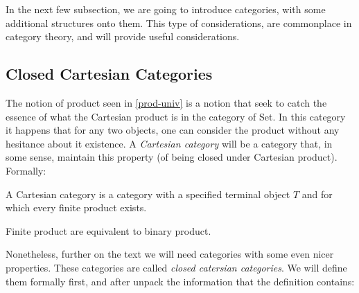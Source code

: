   In the next few subsection, we are going to introduce categories, with some additional structures onto them. This type of considerations, are commonplace in category theory, and will provide useful considerations.

  


  \subsection{Closed Cartesian Categories}\label{subsect:CCC}

  The notion of product seen in \ref{prod-univ} is a notion that seek to catch the essence of what the Cartesian product is in the category of Set. In this category it happens that for any two objects, one can consider the product without any hesitance about it existence. A \emph{Cartesian category} will be a category that, in some sense, maintain this property (of being closed under Cartesian product). Formally: 
  \begin{definition}
    A Cartesian category is a category with a specified terminal object $T$ and for which every finite product exists.
  \end{definition}
  \begin{remark}
    Finite product are equivalent to binary product.
  \end{remark}

Nonetheless, further on the text we will need categories with some even nicer properties. These categories are called \emph{closed catersian categories}. We will define them formally first, and after unpack the information that the definition contains:
  
